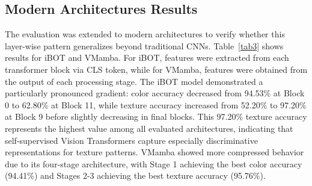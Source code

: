 \documentclass[conference]{IEEEtran}
\begin{document}
\subsection{Modern Architectures Results}

The evaluation was extended to modern architectures to verify whether this layer-wise pattern generalizes beyond traditional CNNs. Table~\ref{tab3} shows results for iBOT and VMamba. For iBOT, features were extracted from each transformer block via CLS token, while for VMamba, features were obtained from the output of each processing stage. The iBOT model demonstrated a particularly pronounced gradient: color accuracy decreased from 94.53\% at Block 0 to 62.80\% at Block 11, while texture accuracy increased from 52.20\% to 97.20\% at Block 9 before slightly decreasing in final blocks. This 97.20\% texture accuracy represents the highest value among all evaluated architectures, indicating that self-supervised Vision Transformers capture especially discriminative representations for texture patterns. VMamba showed more compressed behavior due to its four-stage architecture, with Stage 1 achieving the best color accuracy (94.41\%) and Stages 2-3 achieving the best texture accuracy (95.76\%).
\end{document}
